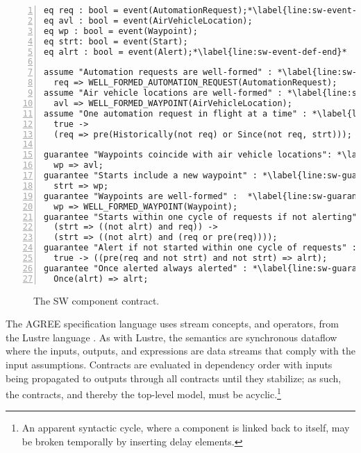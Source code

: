 \newsavebox{\sw}
\begin{lrbox}{\sw}
\begin{lstlisting}[style=agree,numbers=left]
eq req : bool = event(AutomationRequest);*\label{line:sw-event-def-start}*
eq avl : bool = event(AirVehicleLocation);
eq wp : bool = event(Waypoint);
eq strt: bool = event(Start);
eq alrt : bool = event(Alert);*\label{line:sw-event-def-end}*

assume "Automation requests are well-formed" : *\label{line:sw-assume-1}*
  req => WELL_FORMED_AUTOMATION_REQUEST(AutomationRequest);
assume "Air vehicle locations are well-formed" : *\label{line:sw-assume-2}*
  avl => WELL_FORMED_WAYPOINT(AirVehicleLocation);    
assume "One automation request in flight at a time" : *\label{line:sw-assume-3}*
  true -> 
  (req => pre(Historically(not req) or Since(not req, strt)));
      
guarantee "Waypoints coincide with air vehicle locations": *\label{line:sw-guarantee-1}*
  wp => avl;
guarantee "Starts include a new waypoint" : *\label{line:sw-guarantee-2}*
  strt => wp;
guarantee "Waypoints are well-formed" :  *\label{line:sw-guarantee-3}*
  wp => WELL_FORMED_WAYPOINT(Waypoint);
guarantee "Starts within one cycle of requests if not alerting" : *\label{line:sw-guarantee-4}*
  (strt => ((not alrt) and req)) -> 
  (strt => ((not alrt) and (req or pre(req))));
guarantee "Alert if not started within one cycle of requests" : *\label{line:sw-guarantee-5}*
  true -> ((pre(req and not strt) and not strt) => alrt);
guarantee "Once alerted always alerted" : *\label{line:sw-guarantee-6}*
  Once(alrt) => alrt;
\end{lstlisting}
\end{lrbox}

\begin{figure}
  \begin{center}
    \scalebox{0.62}{\usebox{\sw}}
  \end{center}
  \caption{The SW component contract.}
  \label{fig:sw}
\end{figure}

The AGREE specification language uses stream concepts, and operators, from the Lustre language \cite{10.1145/41625.41641}.
As with Lustre, the semantics are synchronous dataflow where the inputs, outputs, and expressions are data streams that comply with the input assumptions.
Contracts are evaluated in dependency order with inputs being propagated to outputs through all contracts until they stabilize; as such, the contracts, and thereby the top-level model, must be acyclic.\footnote{An apparent syntactic cycle, where a component is linked back to itself, may be broken temporally by inserting delay elements.}

